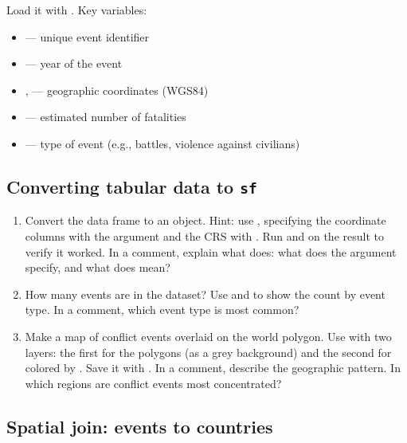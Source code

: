 Load it with . Key variables:
\begin{itemize}
  \item {} --- unique event identifier
  \item {} --- year of the event
  \item {},  --- geographic coordinates (WGS84)
  \item {} --- estimated number of fatalities
  \item {} --- type of event (e.g., battles, violence against civilians)
\end{itemize}

\subsection{Converting tabular data to \texttt{sf}}

\begin{enumerate}[label=\alph*)]
  \item Convert the  data frame to an  object. Hint: use , specifying the coordinate columns with the  argument and the CRS with . Run  and  on the result to verify it worked. In a comment, explain what  does: what does the  argument specify, and what does  mean?

  \item How many events are in the dataset? Use  and  to show the count by event type. In a comment, which event type is most common?

  \item Make a map of conflict events overlaid on the world polygon. Use  with two  layers: the first for the  polygons (as a grey background) and the second for  colored by . Save it with . In a comment, describe the geographic pattern. In which regions are conflict events most concentrated?
\end{enumerate}

\subsection{Spatial join: events to countries}

